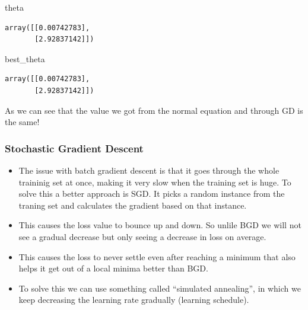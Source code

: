 \documentclass[
]{report}
\newenvironment{Shaded}{\begin{snugshade}}{\end{snugshade}}
\newcommand{\NormalTok}[1]{\textcolor[rgb]{0.00,0.23,0.31}{#1}}
\providecommand{\tightlist}{%
  \setlength{\itemsep}{0pt}\setlength{\parskip}{0pt}}\usepackage{longtable,booktabs,array}
\begin{document}
\begin{Shaded}
\begin{Highlighting}[]
\NormalTok{theta}
\end{Highlighting}
\end{Shaded}

\begin{verbatim}
array([[0.00742783],
       [2.92837142]])
\end{verbatim}

\begin{Shaded}
\begin{Highlighting}[]
\NormalTok{best\_theta}
\end{Highlighting}
\end{Shaded}

\begin{verbatim}
array([[0.00742783],
       [2.92837142]])
\end{verbatim}

As we can see that the value we got from the normal equation and through
GD is the same!

\hypertarget{stochastic-gradient-descent}{%
\subsubsection{Stochastic Gradient
Descent}\label{stochastic-gradient-descent}}

\begin{itemize}
\tightlist
\item
  The issue with batch gradient descent is that it goes through the
  whole traininig set at once, making it very slow when the training set
  is huge. To solve this a better approach is SGD. It picks a random
  instance from the traning set and calculates the gradient based on
  that instance.
\item
  This causes the loss value to bounce up and down. So unlile BGD we
  will not see a gradual decrease but only seeing a decrease in loss on
  average.
\item
  This causes the loss to never settle even after reaching a minimum
  that also helps it get out of a local minima better than BGD.
\item
  To solve this we can use something called ``simulated annealing'', in
  which we keep decreasing the learning rate gradually (learning
  schedule).
\end{itemize}
\end{document}
